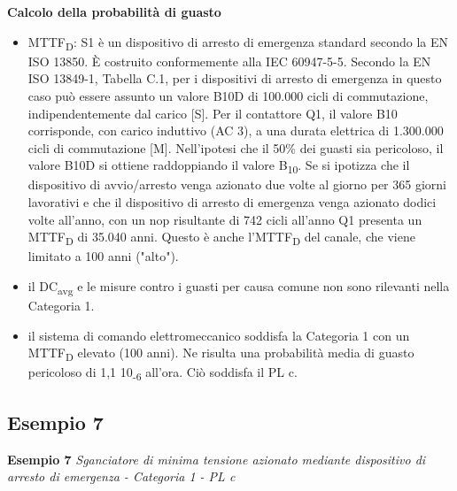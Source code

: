 \textbf{Calcolo della probabilità di guasto}
\begin{itemize}
    \item MTTF\textsubscript{D}: S1 è un dispositivo di arresto di emergenza standard secondo la EN ISO 13850. È costruito conformemente alla IEC 60947-5-5. Secondo la EN ISO 13849-1, Tabella C.1, per i dispositivi di arresto di emergenza in questo caso può essere assunto un valore B10D di 100.000 cicli di commutazione, indipendentemente dal carico [S]. Per il contattore Q1, il valore B10 corrisponde, con carico induttivo (AC 3), a una durata elettrica di 1.300.000 cicli di commutazione [M]. Nell'ipotesi che il 50\% dei guasti sia pericoloso, il valore B10D si ottiene raddoppiando il valore B\textsubscript{10}. Se si ipotizza che il dispositivo di avvio/arresto venga azionato due volte al giorno per 365 giorni lavorativi e che il dispositivo di arresto di emergenza venga azionato dodici volte all'anno, con un nop risultante di 742 cicli all'anno Q1 presenta un MTTF\textsubscript{D} di 35.040 anni. Questo è anche l'MTTF\textsubscript{D} del canale, che viene limitato a 100 anni ("alto").
    \item il DC\textsubscript{avg} e le misure contro i guasti per causa comune non sono rilevanti nella Categoria 1.
    \item il sistema di comando elettromeccanico soddisfa la Categoria 1 con un MTTF\textsubscript{D} elevato (100 anni). Ne risulta una probabilità media di guasto pericoloso di 1,1 10\textsubscript{-6} all'ora. Ciò soddisfa il PL c.
\end{itemize}
\clearpage

\subsection{Esempio 7}
\label{sec:08-2-7}
\textbf{Esempio 7}
\textit{Sganciatore di minima tensione azionato mediante dispositivo di arresto di emergenza - Categoria 1 - PL c}

\begin{center}
    \begin{minipage}{\textwidth}
        \centering
        \captionsetup{hypcap=false}
        \resizebox{0.6\textwidth}{!}{}
        \label{fig:08-15}
    \end{minipage}
\end{center}

